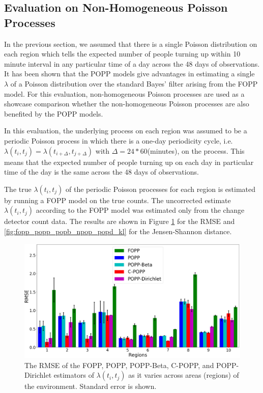 \subsection*{Evaluation on Non-Homogeneous Poisson Processes}

In the previous section, we assumed that there is a single Poisson distribution on each region which tells the expected number of people turning up within 10 minute interval in any particular time of a day across the 48 days of observations. It has been shown that the POPP models give advantages in estimating a single $\lambda$ of a Poisson distribution over the standard Bayes' filter arising from the FOPP model. For this evaluation, non-homogeneous Poisson processes are used as a showcase comparison whether the non-homogeneous Poisson processes are also benefited by the POPP models.

In this evaluation, the underlying process on each region was assumed to be a periodic Poisson process in which there is a one-day periodicity cycle, i.e. $\lambda(t_i, t_j) = \lambda(t_{i + \Delta}, t_{j + \Delta})$ with $\Delta = 24 * 60$(minutes), on the process. This means that the expected number of people turning up on each day in particular time of the day is the same across the 48 days of observations.

The true $\lambda(t_i, t_j)$ of the periodic Poisson processes for each region is estimated by running a FOPP model on the true counts. The uncorrected estimate $\lambda(t_i, t_j)$ according to the FOPP model was estimated only from the change detector count data. The results are shown in Figure \ref{fig:fopp_popp_popb_npop_popd_rmse} for the RMSE and \ref{fig:fopp_popp_popb_npop_popd_kl} for the Jensen-Shannon distance.

\begin{figure}[t!]
	\centering
	\includegraphics[width=0.95\columnwidth]{./figures/fopp_popp_popb_npop_popd_rmse.png}
	\caption{The RMSE of the FOPP, POPP, POPP-Beta, C-POPP, and POPP-Dirichlet estimators of $\lambda(t_i, t_j)$ as it varies across areas (regions) of the environment. Standard error is shown.}
	\label{fig:fopp_popp_popb_npop_popd_rmse}
\end{figure}

